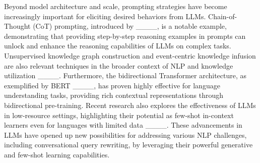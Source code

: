 Beyond model architecture and scale, prompting strategies have become increasingly important for eliciting desired behaviors from LLMs. Chain-of-Thought (CoT) prompting, introduced by ____, is a notable example, demonstrating that providing step-by-step reasoning examples in prompts can unlock and enhance the reasoning capabilities of LLMs on complex tasks.  Unsupervised knowledge graph construction and event-centric knowledge infusion are also relevant techniques in the broader context of NLP and knowledge utilization ____. Furthermore, the bidirectional Transformer architecture, as exemplified by BERT ____, has proven highly effective for language understanding tasks, providing rich contextual representations through bidirectional pre-training. Recent research also explores the effectiveness of LLMs in low-resource settings, highlighting their potential as few-shot in-context learners even for languages with limited data ____. These advancements in LLMs have opened up new possibilities for addressing various NLP challenges, including conversational query rewriting, by leveraging their powerful generative and few-shot learning capabilities.